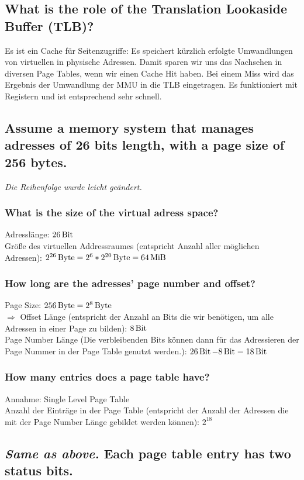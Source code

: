 \subsection{What is the role of the Translation Lookaside Buffer (TLB)?}
Es ist ein Cache für Seitenzugriffe: Es speichert kürzlich erfolgte Umwandlungen von virtuellen in physische Adressen.
Damit sparen wir uns das Nachsehen in diversen Page Tables, wenn wir einen Cache Hit haben.
Bei einem Miss wird das Ergebnis der Umwandlung der MMU in die TLB eingetragen.
Es funktioniert mit Registern und ist entsprechend sehr schnell.

\subsection{Assume a memory system that manages adresses of 26 bits length, with a page size of 256 bytes.}
\textit{Die Reihenfolge wurde leicht geändert.}
\subsubsection{What is the size of the virtual adress space?}
Adresslänge: $26 \operatorname{Bit}$\\
Größe des virtuellen Addressraumes (entspricht Anzahl aller möglichen Adressen): $2^{26} \operatorname{Byte} = 2^6 * 2^{20} \operatorname{Byte} = 64 \operatorname{MiB}$

\subsubsection{How long are the adresses' page number and offset?}
Page Size: $256 \operatorname{Byte} = 2^8 \operatorname{Byte}$\\
$\Rightarrow$ Offset Länge (entspricht der Anzahl an Bits die wir benötigen, um alle Adressen in einer Page zu bilden): $8 \operatorname{Bit}$\\
Page Number Länge (Die verbleibenden Bits können dann für das Adressieren der Page Nummer in der Page Table genutzt werden.): $26\operatorname{Bit} - 8\operatorname{Bit} = 18\operatorname{Bit}$

\subsubsection{How many entries does a page table have?}
Annahme: Single Level Page Table\\
Anzahl der Einträge in der Page Table (entspricht der Anzahl der Adressen die mit der Page Number Länge gebildet werden können): $2^{18}$ 

\addtocounter{subsection}{2}
\subsection{\textit{Same as above.} Each page table entry has two status bits.}
